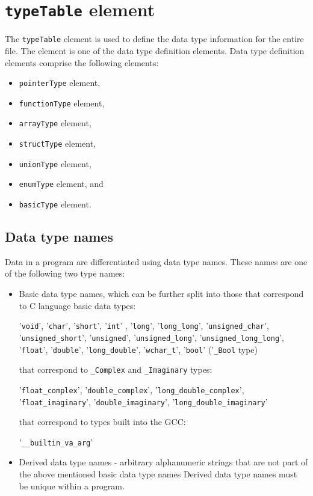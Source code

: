 \section{ {\tt typeTable} element}

The {\tt typeTable} element is used to define the data type information for the entire file. The element is one of the data type definition elements. Data type definition elements comprise the following elements:

\begin{itemize}
\item {\tt pointerType} element,
\item {\tt functionType} element,
\item {\tt arrayType} element,
\item {\tt structType} element,
\item {\tt unionType} element, 
\item {\tt enumType} element, and
\item {\tt basicType} element.
\end{itemize}


\subsection{Data type names}

Data in a program are differentiated using data type names. These names are one of the following two type names:

\begin{itemize}
\item Basic data type names, which can be further split into those
      that correspond to C language basic data types:
      \vspace{2mm}

      '{\tt void}', '{\tt char}', '{\tt short}', '{\tt int}' , '{\tt long}', '{\tt long\_long}', '{\tt unsigned\_char}', '{\tt unsigned\_short}', '{\tt unsigned}', '{\tt unsigned\_long}', '{\tt unsigned\_long\_long}', '{\tt float}', '{\tt double}', '{\tt long\_double}', '{\tt wchar\_t}', '{\tt bool}' ('{\tt \_Bool} type)
      \vspace{2mm}

      that correspond to {\tt \_Complex} and {\tt \_Imaginary} types:
      \vspace{2mm}

      '{\tt float\_complex}', '{\tt double\_complex}', '{\tt long\_double\_complex}', '{\tt float\_imaginary}', '{\tt double\_imaginary}', '{\tt long\_double\_imaginary}'
      \vspace{2mm}

      that correspond to types built into the GCC:
      \vspace{2mm}

      '{\tt \_\_builtin\_va\_arg}'
      \vspace{2mm}

\item Derived data type names - arbitrary alphanumeric strings that are not part of the above mentioned basic data type names
      Derived data type names must be unique within a program.
\end{itemize}


